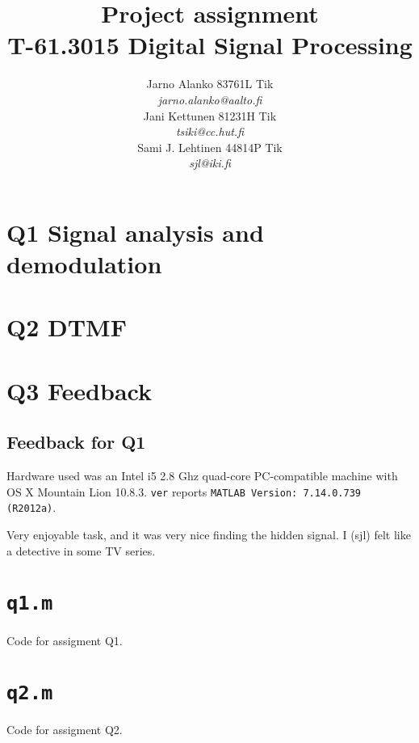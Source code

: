 \documentclass[a4paper]{article}
\begin{document}
\title{Project assignment \\
T-61.3015 Digital Signal Processing}
\author{Jarno Alanko 83761L Tik \\
  {\it jarno.alanko@aalto.fi} \\
  Jani Kettunen 81231H Tik \\
  {\it tsiki@cc.hut.fi} \\
  Sami J. Lehtinen 44814P Tik \\ 
       {\it sjl@iki.fi}}

\maketitle             
\thispagestyle{empty}
\newpage
{}
\setcounter{page}{2}

\section*{Q1 Signal analysis and demodulation }


\section*{Q2 DTMF}


\section*{Q3 Feedback}
\subsection{Feedback for Q1}
Hardware used was an Intel i5 2.8 Ghz quad-core PC-compatible machine
with OS X Mountain Lion 10.8.3.  {\tt ver} reports 
{\tt MATLAB Version: 7.14.0.739 (R2012a)}.

Very enjoyable task, and it was very nice finding the hidden signal.  I
(sjl) felt like a detective in some TV series.

\clearpage




\newpage
\appendix
\section{{\tt q1.m}}
\label{sect:q1m}
Code for assigment Q1.



\newpage
\section{{\tt q2.m}}
\label{sect:q2m}
Code for assigment Q2.


\end{document}
